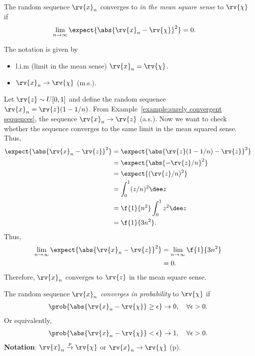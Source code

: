 \begin{definitionBox}
  The random sequence $\rv{x}_{n}$ converges to \emph{in the mean square sense} to $\rv{\chi}$ if
  \begin{align}
      \lim_{n\to\infty}\expect{\abs{\rv{x}_{n}-\rv{\chi}}^{2}} &= 0.
  \end{align}
\end{definitionBox}

\begin{remarkBox}
    The notation is given by
    \begin{itemize}
        \item l.i.m (limit in the mean sense) $\rv{x}_{n}=\rv{\chi}$.
        \item $\rv{x}_{n}\to\rv{\chi}$ (m.s.).
    \end{itemize}
\end{remarkBox}


\begin{example}
    Let $\rv{z}\sim U[0,1]$ and define the random sequence $\rv{x}_{n} = \rv{z}(1-1/n)$. From Example~\ref{example:surely convergent sequences}, the sequence $\rv{x}_{n}\to\rv{z}$ (a.s.). Now we want to check whether the sequence converges to the same limit in the mean squared sense. Thus,
    \begin{align}
        \expect{\abs{\rv{x}_{n} - \rv{z}}^{2}} &= \expect{\abs{\rv{z}(1-1/n) - \rv{z}}^{2}}\\
        &=\expect{\abs{-\rv{z}/n}^{2}}\\
        &= \expect{(\rv{z}/n)^{2}}\\
        &= \int_{0}^{1}(z/n)^{2}\dee z\\
        &= \f{1}{n^{2}}\int_{0}^{1}z^{2}\dee z\\
        &= \f{1}{3n^{2}}.
    \end{align}
    Thus,
    \begin{align}
        \lim_{n\to\infty} \expect{\abs{\rv{x}_{n} - \rv{z}}^{2}} &= \lim_{n\to\infty} \f{1}{3n^{2}}\\
        &= 0.
    \end{align}
    Therefore, $\rv{x}_{n}$ converges to $\rv{z}$ in the mean square sense.
\end{example}


\begin{definitionBox}
    The random sequence $\rv{x}_{n}$ \emph{converges in probability} to $\rv{\chi}$ if
    \begin{align}
        \prob{\abs{\rv{x}_{n} - \rv{\chi}}\geq \epsilon}\to 0, \quad \forall \epsilon>0.
    \end{align}
    Or equivalently,
    \begin{align}
        \prob{\abs{\rv{x}_{n} - \rv{\chi}}< \epsilon}\to 1, \quad \forall \epsilon>0.
    \end{align}
    \textbf{Notation}: $\rv{x}_{n}\overset{p}{\to}\rv{\chi}$ or $\rv{x}_{n}\to\rv{\chi}$ (p).
\end{definitionBox}

